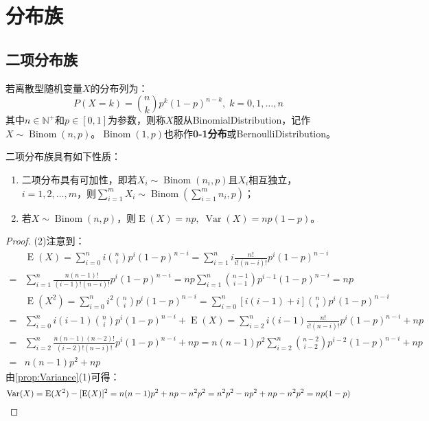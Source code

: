 \section{分布族}

\subsection{二项分布族}
\begin{definition}
	若离散型随机变量$X$的分布列为：
	\begin{equation*}
		P(X=k)=\binom{n}{k}p^k(1-p)^{n-k},\;k=0,1,\dots,n
	\end{equation*}
	其中$n\in\mathbb{N}^+$和$p\in[0,1]$为参数，则称$X$服从\gls{BinomialDistribution}，记作$X\sim\operatorname{Binom}(n,p)$。$\operatorname{Binom}(1,p)$也称作\textbf{0-1分布}或\gls{BernoulliDistribution}。
\end{definition}
\begin{property}\label{prop:Binom}
	二项分布族具有如下性质：
	\begin{enumerate}
		\item 二项分布具有可加性，即若$X_i\sim\operatorname{Binom}(n_i,p)$且$X_i$相互独立，$i=1,2,\dots,m$，则$\sum\limits_{i=1}^{m}X_i\sim\operatorname{Binom}\left(\sum\limits_{i=1}^{m}n_i,p\right)$；
		\item 若$X\sim\operatorname{Binom}(n,p)$，则$\operatorname{E}(X)=np,\;\operatorname{Var}(X)=np(1-p)$。
	\end{enumerate}
\end{property}
\begin{proof}
	(2)注意到：
	\begin{align*}
		&\operatorname{E}(X)=\sum_{i=0}^{n}i\binom{n}{i}p^i(1-p)^{n-i}=\sum_{i=1}^{n}i\frac{n!}{i!(n-i)!}p^i(1-p)^{n-i} \\
		=&\sum_{i=1}^{n}\frac{n(n-1)!}{(i-1)!(n-i)!}p^i(1-p)^{n-i}=np\sum_{i=1}^{n}\binom{n-1}{i-1}p^{i-1}(1-p)^{n-i}=np \\
		&\operatorname{E}(X^2)=\sum_{i=0}^{n}i^2\binom{n}{i}p^i(1-p)^{n-i}=\sum_{i=0}^{n}[i(i-1)+i]\binom{n}{i}p^i(1-p)^{n-i} \\
		=&\sum_{i=0}^{n}i(i-1)\binom{n}{i}p^i(1-p)^{n-i}+\operatorname{E}(X)=\sum_{i=2}^{n}i(i-1)\frac{n!}{i!(n-i)!}p^i(1-p)^{n-i}+np \\
		=&\sum_{i=2}^{n}\frac{n(n-1)(n-2)!}{(i-2)!(n-i)!}p^i(1-p)^{n-i}+np=n(n-1)p^2\sum_{i=2}^{n}\binom{n-2}{i-2}p^{i-2}(1-p)^{n-i}+np \\
		=&n(n-1)p^2+np
	\end{align*}
	由\cref{prop:Variance}(1)可得：
	\begin{equation*}
		\operatorname{Var}(X)=\operatorname{E}(X^2)-[\operatorname{E}(X)]^2=n(n-1)p^2+np-n^2p^2=n^2p^2-np^2+np-n^2p^2=np(1-p)\qedhere
	\end{equation*}
\end{proof}


